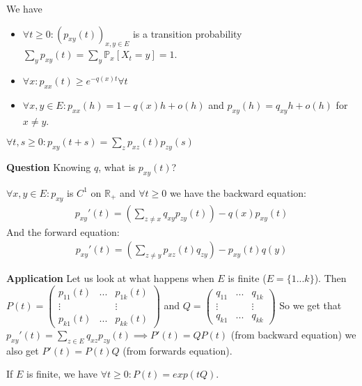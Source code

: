 \begin{rmk}[] We have
\begin{itemize}
	\item $\forall t\geq 0: (p_{xy}(t))_{x,y \in E}$ is a transition probability $\sum_{y}^{} p_{xy}(t) = \sum_{y}^{} \mathbb{P}_{x} \left[ X_t=y \right] =1$.
	\item $\forall x: p_{xx}(t) \geq e^{-q(x) t} \forall t$
	\item $\forall x,y \in E: p_{xx}(h) = 1 - q(x)h + o(h)$ and $p_{xy}(h)=q_{xy}h+o(h)$ for $x \neq y$.
\end{itemize}

\end{rmk}

\begin{prop}
	$\forall t,s \geq 0: p_{xy}(t+s)=\sum_{z}^{} p_{xz}(t)p_{zy}(s)$	
\end{prop}
\noindent
\textbf{Question} Knowing $q$, what is $p_{xy}(t)$?

\begin{theorem}
	$\forall x,y \in E: p_{xy}$ is $C^1$ on $\mathbb{R}_+$ and $\forall t \geq 0$ we have the backward equation:
\begin{align}
 p_{xy}'(t) = \left( \sum_{z \neq x}^{} q_{xy} p_{zy}(t) \right) - q(x) p_{xy}(t)
\end{align}
And the forward equation:
\begin{align}
	 p_{xy}'(t) = \left( \sum_{z \neq y}^{} p_{xz}(t)q_{zy} \right) - p_{xy}(t)q(y)
\end{align}
	
\end{theorem}

\textbf{Application} Let us look at what happens when $E$ is finite ($E = \{1...k\}$). Then $P(t) = 
\begin{pmatrix}
	p_{11}(t) & ... & p_{1k}(t) \\
	\vdots & & \vdots \\
	p_{k1}(t) & ... & p_{k k}(t)
\end{pmatrix}$ 
and $Q = 
\begin{pmatrix}
	q_{11} & ... & q_{1k} \\
	\vdots & & \vdots \\
	q_{k1} & ... & q_{k k }
	
\end{pmatrix}$
So we get that $p_{xy}'(t) = \sum_{z \in E}^{} q_{xz}p_{zy}(t) \implies P'(t) = Q P(t)$ (from backward equation) we also get $P'(t) = P(t)Q$ (from forwards equation).

\begin{theorem}[]
	If $E$ is finite, we have $\forall t\geq 0: P(t) = exp(tQ)$.
\end{theorem}



